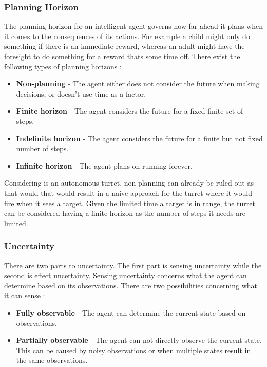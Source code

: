\subsubsection{Planning Horizon}
The planning horizon for an intelligent agent governs how far ahead it plans
when it comes to the consequences of its actions. For example a child might
only do something if there is an immediate reward, whereas an adult might have
the foresight to do something for a reward thats some time off. There exist the
following types of planning horizons \citep[ch.1.5.3]{MIBook}:
\begin{itemize}
	\item \textbf{Non-planning} - The agent either does not consider the
	future when making decisions, or doesn't use time as a factor.
	\item \textbf{Finite horizon} - The agent considers the future for a fixed
	finite set of steps. 
	\item \textbf{Indefinite horizon} - The agent considers the future for a
	finite but not fixed number of steps.
	\item \textbf{Infinite horizon} - The agent plans on running forever.	
\end{itemize}

Considering \name is an autonomous turret, non-planning can already be ruled
out as that would that would result in a naive approach for the turret where it
would fire when it sees a target. Given the limited time a target is in range,
the turret can be considered having a finite horizon as the number of steps it
needs are limited.

\subsubsection{Uncertainty}
There are two parts to uncertainty. The first part is sensing uncertainty while
the second is effect uncertainty. Sensing uncertainty concerns what the agent
can determine based on its observations. There are two possibilities concerning
what it can sense \citep[ch.1.5.4]{MIBook}:
\begin{itemize}
  \item \textbf{Fully observable} - The agent can determine the current state
  based on observations.
  \item \textbf{Partially observable} - The agent can not directly observe
  the current state. This can be caused by noisy observations or when multiple
  states result in the same observations.
\end{itemize}

